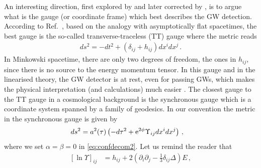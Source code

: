 \documentclass[a4paper,11pt]{article}
\numberwithin{equation}{section}
\begin{document}
An interesting direction, first explored by \cite{DeLuca:2019ufz} and later corrected by \cite{Inomata:2019yww}, is to argue what is the gauge (or coordinate frame) which best describes the GW detection. According to Ref.~\cite{DeLuca:2019ufz}, based on the analogy with asymptotically flat spacetimes, the best gauge is the so-called transverse-traceless (TT) gauge where the metric reads
\begin{align}\label{eq:TTgauge}
ds^2=-dt^2+(\delta_{ij}+h_{ij})dx^i dx^j\,.
\end{align}
In Minkowski spacetime, there are only two degrees of freedom, the ones in $h_{ij}$, since there is no source to the energy momentum tensor. In this gauge and in the linearised theory, the GW detector is at rest, even for passing GWs, which makes the physical interpretation (and calculations) much easier \cite{Misner:1974qy,Maggiore:1900zz}. The closest gauge to the TT gauge in a cosmological background is the synchronous gauge which is a coordinate system spanned by a family of geodesics. In our convention the metric in the synchronous gauge is given by
\begin{align}\label{eq:confdecomsyncrhonous}
ds^2&=a^2(\tau)\left(-d\tau^2+{\rm e}^{2\phi}\Upsilon_{ij}dx^idx^j\right)\,,
\end{align}
where we set $\alpha=\beta=0$ in \eqref{eq:confdecom2}. Let us remind the reader that
\begin{align}
\left[\ln\Upsilon\right]_{ij}&=h_{ij}+2\left(\partial_{i}\partial_{j}-\tfrac{1}{3}\delta_{ij}\Delta\right)E\label{eq:confdecomh2}\,,
\end{align}
\end{document}
